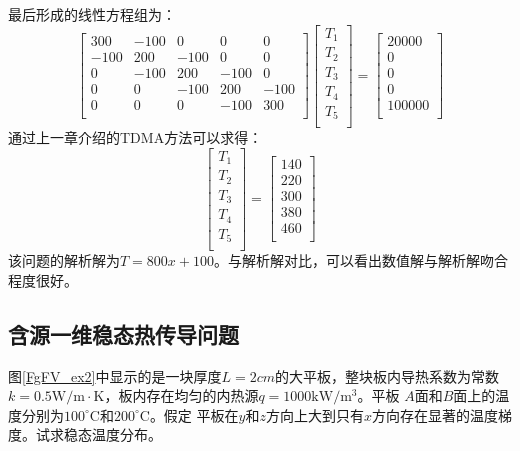 最后形成的线性方程组为：
\begin{equation}
  \begin{bmatrix}
    300 & -100 & 0 & 0 & 0 \\
    -100 & 200 & -100 & 0 & 0 \\
    0 & -100 & 200 & -100 & 0 \\
    0 & 0 & -100 & 200 & -100  \\
    0 & 0 & 0 & -100 & 300 \\
  \end{bmatrix}
  \begin{bmatrix}
    T_{1} \\
    T_{2} \\
    T_{3} \\
    T_{4} \\
    T_{5} \\
  \end{bmatrix}
  =
  \begin{bmatrix}
    20000 \\
    0 \\
    0 \\
    0 \\
    100000 \\
  \end{bmatrix}
\end{equation}
通过上一章介绍的TDMA方法可以求得：
\begin{equation}
  \begin{bmatrix}
    T_{1} \\
    T_{2} \\
    T_{3} \\
    T_{4} \\
    T_{5} \\
  \end{bmatrix}
  =
  \begin{bmatrix}
    140 \\
    220 \\
    300 \\
    380 \\
    460 \\
  \end{bmatrix}
\end{equation}
该问题的解析解为$T=800x+100$。与解析解对比，可以看出数值解与解析解吻合程度很好。

\subsection{含源一维稳态热传导问题}
图\ref{FgFV_ex2}中显示的是一块厚度$L=2cm$的大平板，整块板内导热系数为常数
$k=0.5\mathrm{W/m\cdot K}$，板内存在均匀的内热源$q=1000\mathrm{kW/m^{3}}$。平板
$A$面和$B$面上的温度分别为$100^{\circ}\mathrm{C}$和$200^{\circ}\mathrm{C}$。假定
平板在$y$和$z$方向上大到只有$x$方向存在显著的温度梯度。试求稳态温度分布。

